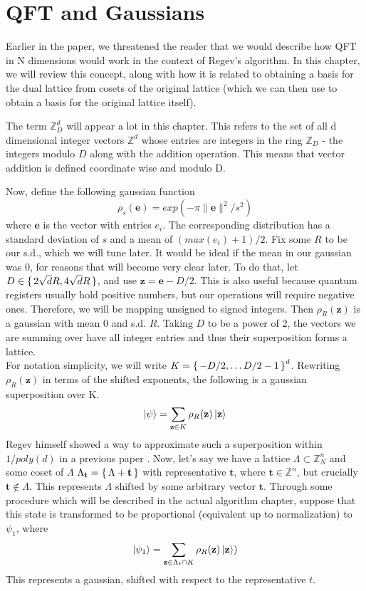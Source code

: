 \chapter{QFT and Gaussians}

Earlier in the paper, we threatened the reader that we would describe how QFT in N dimensions would work in the context of Regev's algorithm. In this chapter, we will review this concept, along with how it is related to obtaining a basis for the dual lattice from cosets of the original lattice (which we can then use to obtain a basis for the original lattice itself).

The term $\mathbb{Z}^d_D$ will appear a lot in this chapter. This refers to the set of all d dimensional integer vectors $\mathbb{Z}^d$ whose entries are integers in the ring $\mathbb{Z}_D$ - the integers modulo $D$ along with the addition operation. This means that vector addition is defined coordinate wise and modulo D.

Now, define the following gaussian function $$\rho_s(\mathbf{e}) = exp(-\pi \lVert \mathbf{e} \rVert^2 / s^2)$$
where $\mathbf{e}$ is the vector with entries $e_i$. The corresponding distribution has a standard deviation of $s$ and a mean of $(max(e_i) + 1) / 2$. Fix some $R$ to be our s.d., which we will tune later. It would be ideal if the mean in our gaussian was 0, for reasons that will become very clear later.  To do that, let $D \in \set{2\sqrt{d}R, 4\sqrt{d}R}$, and use $\mathbf{z} =\mathbf{e}- D/2$. This is also useful because quantum registers usually hold positive numbers, but our operations will require negative ones. Therefore, we will be mapping unsigned to signed integers. Then $\rho_R(\mathbf{z})$ is a gaussian with mean 0 and s.d. $R$. Taking $D$ to be a power of 2, the vectors we are summing over have all integer entries and thus their superposition forms a lattice.\\


For notation simplicity, we will write $K = \set{-D/2,
\dots D/2 -1}^d$.
Rewriting $\rho_R(\mathbf{z})$ in terms of the shifted exponents, the following is a gaussian superposition over K.
\begin{equation}
    \ket{\psi} = \sum_{\mathbf{z} \in K}  \rho_R(\mathbf{z}) \ket{\mathbf{z}}
\end{equation}
 Regev himself showed a way to approximate such a superposition within $1/poly(d)$ in a previous paper 
\cite{Regev2009}. Now, let's say we have a lattice $\Lambda \subset \mathbb{Z}^n_N$ and some coset of $\Lambda$ $\Lambda_{\mathbf{t}} = \set{\Lambda + \mathbf{t}}$ with representative $\mathbf{t}$, where $\mathbf{t} \in \mathbb{Z}^n$, but crucially $\mathbf{t} \notin \Lambda$. This represents $\Lambda$ shifted by some arbitrary vector $\mathbf{t}$. Through some procedure which will be described in the actual algorithm chapter, suppose that this state is transformed to be proportional (equivalent up to normalization) to $\psi_1$, where
\begin{equation}
   \ket{\psi_1} = \sum_{\mathbf{z} \in \Lambda_t \cap K} \rho_R(\mathbf{z})\ket{\mathbf{z}})
   \label{eq8.2}
\end{equation}
This represents a gaussian, shifted with respect to the representative $t$.

